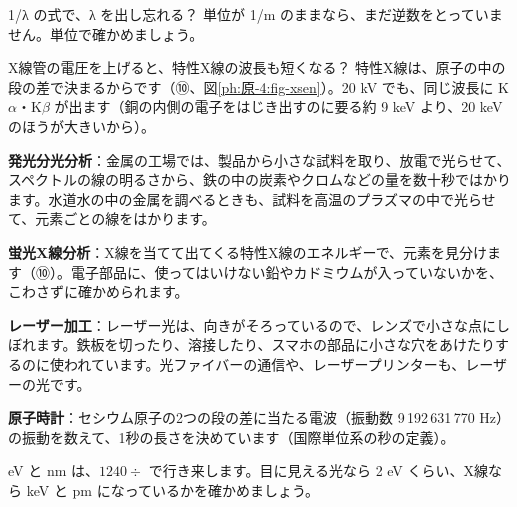 \begin{tsumazuki}{1/λ の式で、λ を出し忘れる？}
単位が 1/m のままなら、まだ逆数をとっていません。単位で確かめましょう。
\end{tsumazuki}

\begin{tsumazuki}{X線管の電圧を上げると、特性X線の波長も短くなる？}
特性X線は、原子の中の段の差で決まるからです（⑩、図\ref{ph:原-4:fig-xsen}）。20 kV でも、同じ波長に K$\alpha$・K$\beta$ が出ます（銅の内側の電子をはじき出すのに要る約 9 keV より、20 keV のほうが大きいから）。
\end{tsumazuki}

\begin{phkougaku}
\textbf{発光分光分析}：金属の工場では、製品から小さな試料を取り、放電で光らせて、スペクトルの線の明るさから、鉄の中の炭素やクロムなどの量を数十秒ではかります。水道水の中の金属を調べるときも、試料を高温のプラズマの中で光らせて、元素ごとの線をはかります。

\textbf{蛍光X線分析}：X線を当てて出てくる特性X線のエネルギーで、元素を見分けます（⑩）。電子部品に、使ってはいけない鉛やカドミウムが入っていないかを、こわさずに確かめられます。

\textbf{レーザー加工}：レーザー光は、向きがそろっているので、レンズで小さな点にしぼれます。鉄板を切ったり、溶接したり、スマホの部品に小さな穴をあけたりするのに使われています。光ファイバーの通信や、レーザープリンターも、レーザーの光です。

\textbf{原子時計}：セシウム原子の2つの段の差に当たる電波（振動数 9\,192\,631\,770 Hz）の振動を数えて、1秒の長さを決めています（国際単位系の秒の定義）。

\begin{phketa}[原子の光の目安]
eV と nm は、$1240\div$ で行き来します。目に見える光なら 2 eV くらい、X線なら keV と pm になっているかを確かめましょう。
\end{phketa}
\end{phkougaku}

